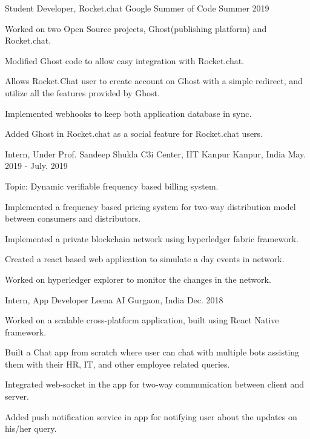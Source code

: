 \begin{cventries}

  \cventry
  {Student Developer, Rocket.chat}
  {Google Summer of Code}
  {}
  {Summer 2019}
  {
    \begin{cvitems}
      \item {Worked on two Open Source projects, Ghost(publishing platform) and Rocket.chat.}
      \item {Modified Ghost code to allow easy integration with Rocket.chat.}
      \item {Allows Rocket.Chat user to create account on Ghost with a simple redirect, and utilize all the features provided by Ghost.}
      \item {Implemented webhooks to keep both application database in sync.}
      \item {Added Ghost in Rocket.chat as a social feature for Rocket.chat users.}
    \end{cvitems}
  }
  
    \cventry
  {Intern, Under Prof. Sandeep Shukla}
  {C3i Center, IIT Kanpur}
  {Kanpur, India}
  {May. 2019 - July. 2019}
  {
    \begin{cvitems}
    	  \item {Topic: Dynamic verifiable frequency based billing system.}
          \item {Implemented a frequency based pricing system for two-way distribution model between consumers and distributors.}
          \item {Implemented a private blockchain network using hyperledger fabric framework.}
          \item {Created a react based web application to simulate a day events in network.}
          \item {Worked on hyperledger explorer to monitor the changes in the network.}
    \end{cvitems}
  }
  
    \cventry
  {Intern, App Developer}
  {Leena AI}
  {Gurgaon, India}
  {Dec. 2018}
  {
    \begin{cvitems}
          \item {Worked on a scalable cross-platform application, built using React Native framework.}
          \item {Built a Chat app from scratch where user can chat with multiple bots assisting them with their HR, IT, and other employee related queries.}
          \item {Integrated web-socket in the app for two-way communication between client and server.}
          \item {Added push notification service in app for notifying user about the updates on his/her query.}
    \end{cvitems}
  }


\end{cventries}
